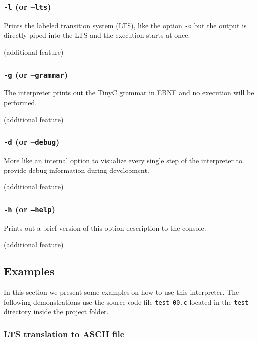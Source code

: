 \documentclass[english,a4paper,oneside]{article}%
\begin{document}
\subsubsection{\texttt{-l} (or \texttt{--lts})}
		Prints the labeled transition system (LTS), like the option \texttt{-o} but the output is directly piped into the LTS and the execution starts at once.
		\begin{flushright}\footnotesize{(additional feature)}\end{flushright}
		
\subsubsection{\texttt{-g} (or \texttt{--grammar})}
		The interpreter prints out the TinyC grammar in EBNF and no execution will be performed.
		\begin{flushright}\footnotesize{(additional feature)}\end{flushright}
		
\subsubsection{\texttt{-d} (or \texttt{--debug})}
		More like an internal option to visualize every single step of the interpreter to provide debug information during development.
		\begin{flushright}\footnotesize{(additional feature)}\end{flushright}
		
\subsubsection{\texttt{-h} (or \texttt{--help})}
		Prints out a brief version of this option description to the console.
		\begin{flushright}\footnotesize{(additional feature)}\end{flushright}
		

\newpage
\subsection{Examples}
In this section we present some examples on how to use this interpreter. The following demonstrations use the source code file \texttt{test\_00.c} located in the \texttt{test} directory inside the project folder.

\subsubsection{LTS translation to ASCII file}
\end{document}

